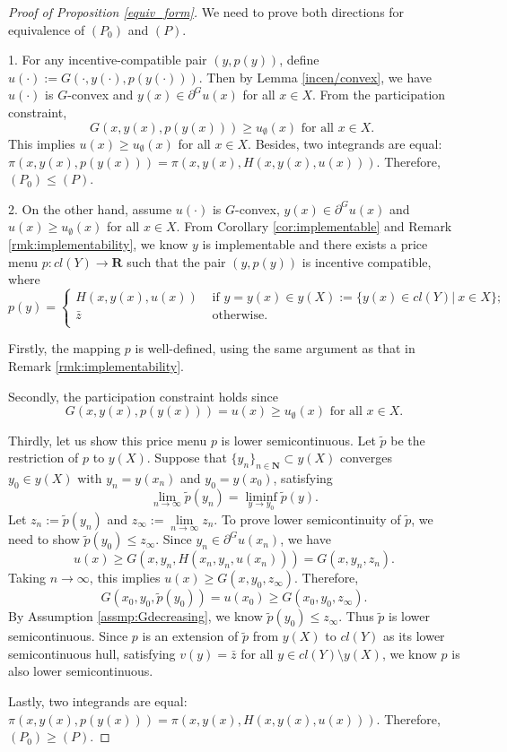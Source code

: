 \documentclass[a4paper, 11pt]{amsart}
\numberwithin{equation}{section}
\theoremstyle{plain}
\theoremstyle{definition}
\theoremstyle{remark}
\newcommand{\R}{\mathbf{R}}
\newcommand{\N}{\mathbf{N}}
\begin{document}
\begin{proof} [Proof of Proposition \ref{equiv_form}] We need to prove both directions for equivalence of $(P_0)$ and $(P)$.\medskip
	
	1. For any incentive-compatible pair $(y, p(y))$, define $u(\cdot) := G(\cdot,y(\cdot), p(y(\cdot)))$. Then by Lemma \ref{incen/convex}, we have $u(\cdot)$ is $G$-convex and $y(x) \in \partial^G u(x)$ for all $x \in X$. From the participation constraint, 
	$$G(x, y(x), p(y(x))) \ge u_{\emptyset}(x) \text{ for all $x\in X$. }$$
	This implies $u(x)\ge u_{\emptyset}(x)$ for all $x\in X$. Besides, two integrands are equal: $\pi(x, y(x), p(y(x))) = \pi(x,y(x), H(x,y(x), u(x)))$. Therefore, $(P_0) \le (P)$.\medskip
	
	2. On the other hand, assume $u(\cdot)$ is $G$-convex, $y(x)\in \partial^G u(x)$ and $u(x) \ge u_{\emptyset}(x)$ for all $x \in X$. From Corollary \ref{cor:implementable} and Remark \ref{rmk:implementability}, we know $y$ is implementable and there exists a price menu $p: cl(Y) \rightarrow \R$ such that the pair $(y, p(y))$ is incentive compatible, where
	\begin{equation*}
		p(y) =
		\begin{cases}
			H(x,y(x), u(x)) & \text{ if } y = y(x) \in y(X) :=\{ y(x) \in cl(Y) |~ x \in X \};\\
			\bar{z} & \text{ otherwise}.\\
		\end{cases}
	\end{equation*}
	
	Firstly, the mapping $p$ is well-defined, using the same argument as that in Remark \ref{rmk:implementability}. %
	
	Secondly, the participation constraint holds since 
	$$G(x,y(x), p(y(x))) = u(x) \ge u_{\emptyset}(x) \text{ for all $x\in X$.}$$ 

	
	Thirdly, let us show this price menu $p$ is lower semicontinuous. Let $\tilde{p}$ be the restriction of $p$ to $y(X)$. Suppose that $\{y_n\}_{n\in \N} \subset y(X)$ converges $y_0 \in y(X)$ with $y_n = y(x_n)$ and $y_0 = y(x_0)$, satisfying $$\lim\limits_{n \rightarrow \infty} \tilde{p}(y_n) = \liminf\limits_{y \rightarrow y_{0}} \tilde{p}(y).$$  
	Let $z_n:= \tilde{p}(y_n)$ and $z_{\infty}:=\lim\limits_{n \rightarrow \infty} z_n$. To prove lower semicontinuity of $\tilde{p}$, we need to show $\tilde{p}(y_0)\le z_{\infty}$.  Since $y_n \in \partial^G u(x_n)$, we have $$u(x) \ge G(x,y_n, H(x_n, y_n, u(x_n))) = G(x, y_n, z_n).$$ Taking $n\rightarrow \infty$, this implies $u(x)\ge G(x, y_0, z_{\infty})$. Therefore, 
	$$G(x_0, y_0, \tilde{p}(y_0)) = u(x_0) \ge G(x_0, y_0, z_{\infty}).$$ By Assumption \ref{assmp:Gdecreasing}, we know $\tilde{p}(y_0) \le z_{\infty}$. Thus $\tilde{p}$ is lower semicontinuous. Since $p$ is an extension of $\tilde{p}$ from $y(X)$ to $cl(Y)$ as its lower semicontinuous hull, satisfying $v(y)= \bar{z}$ for all $y\in cl(Y)\setminus y(X)$, we know $p$ is also lower semicontinuous.
	\medskip
	
	Lastly, two integrands are equal: $\pi(x, y(x), p(y(x))) = \pi(x,y(x), H(x,y(x), u(x)))$. Therefore, $(P_0) \ge (P)$.
\end{proof}
\end{document}
